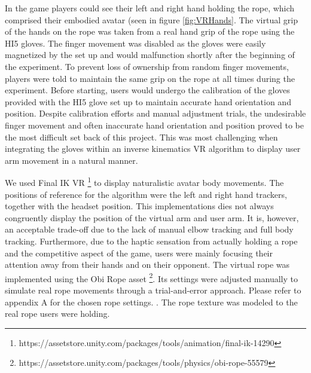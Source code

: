 In the game players could see their left and right hand holding the rope, which comprised their embodied avatar (seen in figure \ref{fig:VRHands}. The virtual grip of the hands on the rope was taken from a real hand grip of the rope using the HI5 gloves. The finger movement was disabled as the gloves were easily magnetized by the set up and would malfunction shortly after the beginning of the experiment. To prevent loss of ownership from random finger movements, players were told to maintain the same grip on the rope at all times during the experiment. Before starting, users would undergo the calibration of the gloves provided with the HI5 glove set up to maintain accurate hand orientation and position. Despite calibration efforts and manual adjustment trials, the  undesirable finger movement and often inaccurate hand orientation and position proved to be the most difficult set back of this project. This was most challenging when integrating the gloves within an inverse kinematics VR algorithm to display user arm movement in a natural manner.

We used Final IK VR \footnote{https://assetstore.unity.com/packages/tools/animation/final-ik-14290} to display naturalistic avatar body movements. The positions of reference for the algorithm were the left and right hand trackers, together with the headset position. 
This implementations dies not always congruently display the position of the virtual arm and user arm. It is, however, an acceptable trade-off due to the lack of manual elbow tracking and full body tracking. Furthermore, due to the haptic sensation from actually holding a rope and the competitive aspect of the game, users were mainly focusing their attention away from their hands and on their opponent.
The virtual rope was implemented using the Obi Rope asset \footnote{https://assetstore.unity.com/packages/tools/physics/obi-rope-55579}. Its settings were adjusted manually to simulate real rope movements through a trial-and-error approach. Please refer to appendix A for the chosen rope settings. . The rope texture was modeled to the real rope users were holding. 

